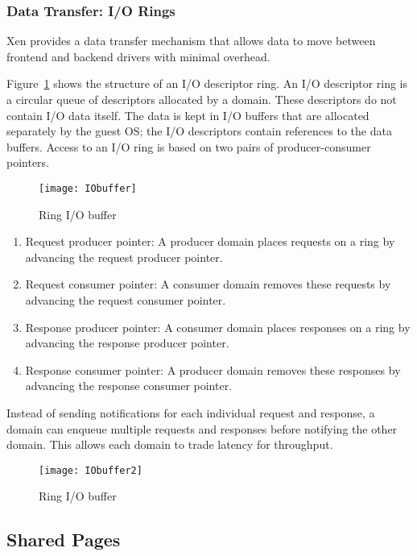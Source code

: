 \subsubsection*{Data Transfer: I/O Rings}
\label{subsec:io rings}
Xen provides a data transfer mechanism that allows data to move
between frontend and backend drivers with minimal overhead.

Figure~\ref{fig:Ring buffer} shows the structure of an I/O descriptor
ring. An I/O descriptor ring is a circular queue of descriptors allocated
by a domain. These descriptors do not contain I/O data itself. The data is kept in I/O buffers
that are allocated separately by the guest OS; the I/O descriptors contain 
references to the data buffers.  Access to an I/O ring is based on two pairs
of producer-consumer pointers.

\begin{figure}[!ht]
\centering
\texttt{[image: IObuffer]}
\caption{Ring I/O buffer}
\label{fig:Ring buffer}
\end{figure}

\begin{enumerate}
\item Request producer pointer: A producer domain places requests on a
ring by advancing the request producer pointer.

\item Request consumer pointer: A consumer domain removes these requests
by advancing the request consumer pointer.

\item Response producer pointer: A consumer domain places responses on
a ring by advancing the response producer pointer.

\item Response consumer pointer: A producer domain removes these responses
by advancing the response consumer pointer.

\end{enumerate} 

Instead of sending notifications for each individual request and response,
a domain can enqueue multiple requests and responses before notifying
the other domain. This allows each domain to trade latency for throughput.

\begin{figure}[!ht]
\centering
\texttt{[image: IObuffer2]}
\caption{Ring I/O buffer}
\label{fig:Ring buffer2}
\end{figure}

\subsection*{Shared Pages}
\label{subsec:sharedpages}
